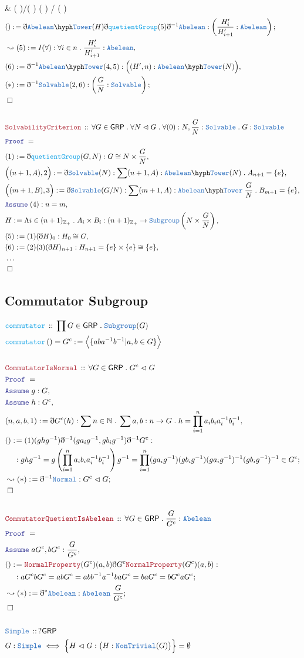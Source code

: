 \documentclass[12pt]{scrartcl}
\newcommand{\TYPE}[1]{\textcolor{NavyBlue}{\mathtt{#1}}}
\newcommand{\FUNC}[1]{\textcolor{Cerulean}{\mathtt{#1}}}
\newcommand{\LOGIC}[1]{\textcolor{Blue}{\mathtt{#1}}}
\newcommand{\THM}[1]{\textcolor{Maroon}{\mathtt{#1}}}
\renewcommand{\.}{\; . \;}
\newcommand{\de}{: \kern 0.1pc =}
\newcommand{\Act}[1]{\left( #1 \right)}
\newcommand{\Theorem}[2]{& \THM{#1} \, :: \, #2 \\ & \Proof = \\ }
\newcommand{\DeclareType}[2]{& \TYPE{#1} \, :: \, #2 \\}
\newcommand{\DefineType}[3]{& #1 : \TYPE{#2} \iff #3 \\}
\newcommand{\DeclareFunc}[2]{& \FUNC{#1} \, :: \, #2 \\}
\newcommand{\DefineNamedFunc}[4]{&  \FUNC{#1}\Act{#2} = #3 \de #4 \\}
\newcommand{\NewLine}{\\ & \kern 1pc}
\newcommand{\Page}[1]{ \begin{align*} #1 \end{align*}   }
\newcommand{ \bd }{ \ByDef }
\newcommand{\NoProof}{ & \ldots \\ \EndProof}
\newcommand{\Int}{\mathbb{Z} }
\newcommand{\Nat}{\mathbb{N} }
\newcommand{\Say}[3]{& #1 \de #2 : #3, \\}
\newcommand{\Conclude}[3]{& #1 \de #2 : #3; \\}
\newcommand{\Derive}[3]{& \leadsto #1 \de #2 : #3, \\}
\newcommand{\DeriveConclude}[3]{& \leadsto #1 \de #2 : #3 ; \\}
\newcommand{\Assume}[2]{& \LOGIC{Assume} \; #1 : #2, \\}
\newcommand{\QED}{\; \square}
\newcommand{\EndProof}{& \QED \\}
\newcommand{\ByDef}{\eth}
\newcommand{\Proof}{\LOGIC{Proof} \; }
\newcommand{\Abel}{\TYPE{Abelean}}
\newcommand{\Nrml}{\vartriangleleft}
\newcommand{\GRP}{\mathsf{GRP}}
\begin{document}
{{	   \cong  \NewLine \cong
	    \left(  \right)/\left(  \right)
	    \cong 
	       \cong 
	     \left( \right) / \left(  \right)
	}
}\Page{  
	\Conclude{()}{ \bd \Abel \hyph \TYPE{Tower}(H) \bd \FUNC{quetientGroup}(5)\bd^{-1} \Abel  }
	{\left(  \frac{H'_i}{H'_{i + 1}}  : \Abel      \right) }
	\Derive{(5)}{I(\forall)}{\forall i \in n \. \frac{H'_i}{H'_{i+1}} : \Abel}
	\Say{(6)}{\bd^{-1} \Abel \hyph \TYPE{Tower}(4,5)}{\Big( (H',n) : \Abel \hyph \TYPE{Tower}(N) \Big)}
	\Conclude{(*)}{\bd^{-1} \TYPE{Solvable}(2,6)}{\left( \frac{G}{N} :  \TYPE{Solvable}\right)}
	\EndProof	
	\\
	\Theorem{SolvabilityCriterion}{\forall G \in \GRP \. \forall N \Nrml G \. 
	\forall (0) : N , \frac{G}{N} : \TYPE{Solvable} \. G : \TYPE{Solvable}}
	\Say{(1)}{\bd \FUNC{quetientGroup}(G,N)}{G \cong N \times \frac{G}{N}}
	\Say{\Big((n + 1,A),2\Big)}{ \bd \TYPE{Solvable}(N)}{ 
		\sum (n + 1,A) : \Abel\hyph \TYPE{  Tower  }(N) \.  A_{n+1} = \{e\}  }
	\Say{\Big((m + 1,B),3\Big)}{ \bd \TYPE{Solvable}(G/N)}{ 
		\sum (m + 1,A) : \Abel\hyph \TYPE{  Tower  } \; \frac{G}{N} \. B_{m+1} = \{e\}   }
	\Assume{(4)}{n=m}
	\Say{H}{\Lambda i \in (n+1)_{\Int_+} \. A_i \times B_i}{ 
		(n + 1)_{\Int_+} \to \TYPE{Subgroup}\left( N \times \frac{G}{N}\right)    }
	\Say{(5)}{ (1)(\bd H)_0  }{ H_0 \cong G}
	\Say{(6)}{(2)(3)(\bd H)_{n+1}}{ H_{n+1} = \{e\} \times \{e\} \cong \{e\} }
	\NoProof
}
\newpage 
\subsection{Commutator Subgroup}
\Page{
	\DeclareFunc{ commutator  }{\prod G \in \GRP \.  \TYPE{Subgroup}(G)}
	\DefineNamedFunc{commutator}{  }{G^c}{\Big\langle \{ aba^{-1}b^{-1} | a,b \in G  \} \Big\rangle}
	\\
	\Theorem{CommutatorIsNormal}{\forall  G \in \GRP \. G^c \Nrml G  }
	\Assume{g}{G}
	\Assume{h}{G^c}
	\Say{ (n,a,b,1) }{\bd G^c(h)}{ \sum n \in \Nat \. \sum a,b : n \to G \. h = \prod^n_{i=1} a_i b_i a_i^{-1} b^{-1}_i}
	\Conclude{  ()   }{ (1)(ghg^{-1}) \bd^{-1} (ga_ig^{-1},gb_ig^{-1}) \bd^{-1} G^c         }
	{  \NewLine : 
	   ghg^{-1} = g\left( \prod^n_{i=1} a_i b_i a_i^{-1} b_i^{-1}  \right)g^{-1} = \prod^n_{i=1} (ga_ig^{-1})(gb_ig^{-1})
		(ga_ig^{-1})^{-1} (gb_i g^{-1})^{-1} \in G^c 
	}
	\DeriveConclude{(*)}{ \bd^{-1}\TYPE{Normal}}{ G^c \Nrml G  }
	\EndProof
	\\
	\Theorem{CommutatorQuetientIsAbelean}{\forall G \in \GRP \. \frac{G}{G^c } : \Abel}
	\Assume{aG^c,bG^c}{\frac{G}{G^c}}
	\Conclude{()}{\THM{NormalProperty}(G^c)(a,b) \bd G^c \THM{NormalProperty}(G^c)(a,b)   }
	{ 
	 \NewLine :
	 aG^cbG^c = abG^c = abb^{-1}a^{-1}baG^c = baG^c  = bG^caG^c  }
	\DeriveConclude{(*)}{\bd^{*}\Abel}{\Abel \; \frac{G}{G^c}}                               
	\EndProof
	\\
	\DeclareType{Simple}{?\GRP}
	\DefineType{G}{Simple}{\Big\{ H \Nrml G : \big(H : \TYPE{NonTrivial}(G)\big)  \Big\} = \emptyset  }
}
\newpage
\end{document}
